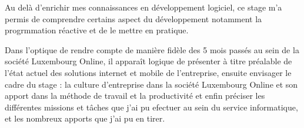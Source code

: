 \documentclass[report, backcover, french]{upmethodology-document}
\begin{document}
Au delà d'enrichir mes connaissances en développement logiciel, ce stage m'a permis de comprendre certains aspect du développement notamment la progrmmation réactive et de le mettre en pratique.

Dans l'optique de rendre compte de manière fidèle des 5 mois passés au sein de la société  Luxembourg Online, il apparaît logique de présenter à titre préalable de l'état actuel des solutions internet et mobile de l'entreprise, ensuite envisager le cadre du stage : la culture d'entreprise dans la société Luxembourg Online et son apport dans la méthode de travail et la productivité et enfin préciser les différentes missions et tâches que j'ai pu efectuer au sein du service informatique, et les nombreux apports que j'ai pu en tirer.
\end{document}
